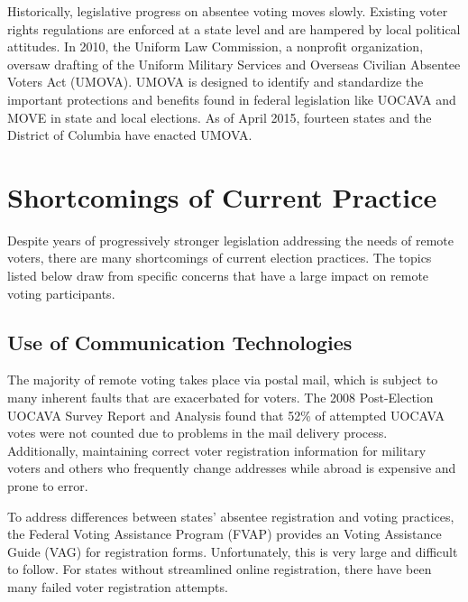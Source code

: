 
Historically, legislative progress on absentee voting moves
slowly. Existing voter rights regulations are enforced at a state
level and are hampered by local political attitudes. In 2010, the
Uniform Law Commission, a nonprofit organization, oversaw drafting of
the Uniform Military Services and Overseas Civilian Absentee Voters
Act (UMOVA). UMOVA is designed to identify and standardize the
important protections and benefits found in federal legislation like
UOCAVA and MOVE in state and local elections. As of April 2015,
fourteen states and the District of Columbia have enacted UMOVA.

\section{Shortcomings of Current Practice}

Despite years of progressively stronger legislation addressing the
needs of remote voters, there are many shortcomings of current
election practices. The topics listed below draw from specific
concerns that have a large impact on remote voting participants.

\subsection{Use of Communication Technologies}
The majority of remote voting takes place via postal mail, which is
subject to many inherent faults that are exacerbated for voters. The
2008 Post-Election UOCAVA Survey Report and Analysis found that 52\%
of attempted UOCAVA votes were not counted due to problems in the mail
delivery process. Additionally, maintaining correct voter registration
information for military voters and others who frequently change
addresses while abroad is expensive and prone to error.



To address differences between states' absentee registration and
voting practices, the Federal Voting Assistance Program (FVAP) provides an
Voting Assistance Guide (VAG) for registration forms. Unfortunately, this is
very large and difficult to follow. For states without streamlined
online registration, there have been many failed voter registration
attempts.

